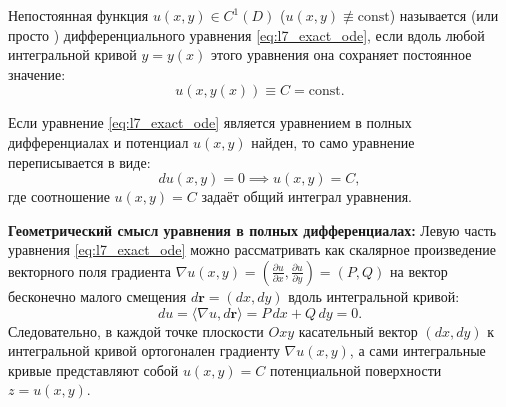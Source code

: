 \begin{definition}
    Непостоянная функция $u(x, y) \in C^1(D)$ ($u(x, y) \not\equiv \text{const}$)
    называется  (или просто )
    дифференциального уравнения \eqref{eq:l7_exact_ode}, если вдоль любой
    интегральной кривой $y = y(x)$ этого уравнения она сохраняет постоянное
    значение:
    \[
        u(x, y(x)) \equiv C = \text{const}.
    \]
\end{definition}

Если уравнение \eqref{eq:l7_exact_ode} является уравнением в полных
дифференциалах и потенциал $u(x, y)$ найден, то само уравнение переписывается
в виде:
\begin{equation} \label{eq:l7_first_int}
    du(x, y) = 0 \implies u(x, y) = C, \tag{7}
\end{equation}
где соотношение $u(x, y) = C$ задаёт общий интеграл уравнения.

\textbf{Геометрический смысл уравнения в полных дифференциалах:}
Левую часть уравнения \eqref{eq:l7_exact_ode} можно рассматривать как скалярное
произведение векторного поля градиента
$\nabla u(x, y) = \left(\frac{\partial u}{\partial x}, \frac{\partial u}{\partial y}\right) = (P, Q)$
на вектор бесконечно малого смещения $d\mathbf{r} = (dx, dy)$ вдоль
интегральной кривой:
\[
    du = \langle \nabla u, d\mathbf{r} \rangle = P \, dx + Q \, dy = 0.
\]
Следовательно, в каждой точке плоскости $Oxy$ касательный вектор $(dx, dy)$ к
интегральной кривой ортогонален градиенту $\nabla u(x, y)$, а сами интегральные
кривые представляют собой  $u(x, y) = C$ потенциальной
поверхности $z = u(x, y)$.

